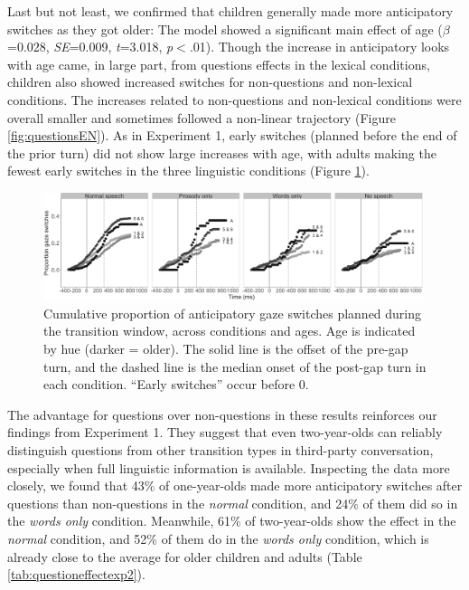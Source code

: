 \documentclass[authoryear, 12pt]{elsarticle}
\begin{document}
Last but not least, we confirmed that children generally made more anticipatory switches as they got older: The model showed a significant main effect of age (\textit{$\beta$}=0.028, \textit{SE}=0.009, \textit{t}=3.018, \textit{p}$<$.01). Though the increase in anticipatory looks with age came, in large part, from questions effects in the lexical conditions, children also showed increased switches for non-questions and non-lexical conditions. The increases related to non-questions and non-lexical conditions were overall smaller and sometimes followed a non-linear trajectory (Figure \ref{fig:questionsEN}). As in Experiment 1, early switches (planned before the end of the prior turn) did not show large increases with age, with adults making the fewest early switches in the three linguistic conditions (Figure \ref{fig:cumulativeEN}).

\begin{figure}[ht]
\begin{center}
\includegraphics[width=0.99\textwidth]{figures/FIG-cumulative-EN.png}
\end{center}
\caption{Cumulative proportion of anticipatory gaze switches planned during the transition window, across conditions and ages. Age is indicated by hue (darker = older). The solid line is the offset of the pre-gap turn, and the dashed line is the median onset of the post-gap turn in each condition. ``Early switches'' occur before 0.} 
\label{fig:cumulativeEN}
\end{figure}

The advantage for questions over non-questions in these results reinforces our findings from Experiment 1. They suggest that even two-year-olds can reliably distinguish questions from other transition types in third-party conversation, especially when full linguistic information is available. Inspecting the data more closely, we found that 43\% of one-year-olds made more anticipatory switches after questions than non-questions in the \textit{normal} condition, and 24\% of them did so in the \textit{words only} condition. Meanwhile, 61\% of two-year-olds show the effect in the \textit{normal} condition, and 52\% of them do in the \textit{words only} condition, which is already close to the average for older children and adults (Table \ref{tab:questioneffectexp2}).
\end{document}
